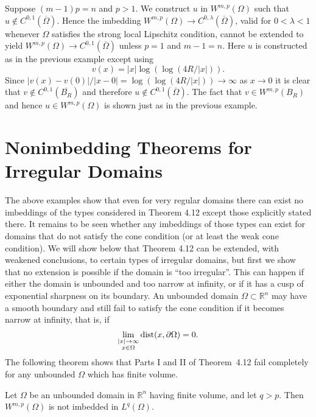 \begin{example}
  Suppose $(m-1) p=n$ and $p>1$. We construct $u$ in $W^{m,p}(\Omega)$ such
  that $u \notin C^{0,1}(\overline{\Omega})$.
  Hence the imbedding $W^{m,p}(\Omega) \rightarrow C^{0, \lambda}(\overline{\Omega})$,
  valid for $0<\lambda<1$ whenever $\Omega$ satisfies the strong local Lipschitz condition,
  cannot be extended to yield $W^{m,p}(\Omega) \rightarrow C^{0,1}(\overline{\Omega})$ unless $p=1$ and $m-1=n$. 
  Here $u$ is constructed as in the previous example except using
  \[
  v(x)=|x| \log (\log (4 R /|x|)) .
  \]
  Since $|v(x)-v(0)| /|x-0|=\log (\log (4 R /|x|)) \rightarrow \infty$ as $x \rightarrow 0$
  it is clear that $v \notin C^{0,1}\left(\overline{B_R}\right)$ and
  therefore $u \notin C^{0,1}(\overline{\Omega})$.
  The fact that $v \in W^{m,p}\left(B_R\right)$ and hence $u \in W^{m,p}(\Omega)$
  is shown just as in the previous example.
\end{example}


\section{Nonimbedding Theorems for Irregular Domains}

\begin{para}
  The above examples show that even for very regular domains there can exist no imbeddings of the types 
  considered in Theorem 4.12 except those explicitly stated there. It remains to be seen whether any imbeddings 
  of those types can exist for domains that do not satisfy the cone condition (or at least the weak cone 
  condition). We will show below that Theorem 4.12 can be extended, with weakened conclusions, to certain types 
  of irregular domains, but first we show that no extension is possible if the domain is ``too irregular''.
  This can happen if either the domain is unbounded and too narrow at infinity, or if it has a cusp of 
  exponential sharpness on its boundary.
  An unbounded domain $\Omega \subset \mathbb{R}^n$ may have a smooth boundary and still fail to satisfy the 
  cone condition if it becomes narrow at infinity, that is, if
  \[
  \lim _{\substack{|x| \rightarrow \infty \\ x \in \Omega}} \operatorname{dist}(x, \partial \Omega)=0 .
  \]
  The following theorem shows that Parts I and II of Theorem~4.12 fail completely for any
  unbounded $\Omega$ which has finite volume.
\end{para}


\begin{theorem}
  Let $\Omega$ be an unbounded domain in $\mathbb{R}^n$ having finite volume, and let $q>p$.
  Then $W^{m,p}(\Omega)$ is not imbedded in $L^q(\Omega)$.
\end{theorem}

